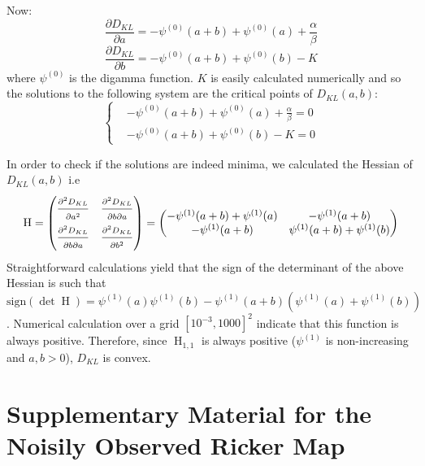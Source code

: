 \documentclass[12pt]{article}
\begin{document}
\begin{appendices}
	Now:
	\begin{equation}
	\frac{\partial D_{KL}}{\partial a} = -\psi^{(0)}(a+b) + \psi^{(0)}(a) + \frac{\alpha}{\beta}
	\end{equation}
	\begin{equation}
	\frac{\partial D_{KL}}{\partial b} = -\psi^{(0)}(a+b) + \psi^{(0)}(b) - K 
	\end{equation}
	where $\psi^{(0)}$ is the digamma function.
	$K$ is easily calculated numerically and so the solutions to the following system are the critical points of $D_{KL}(a,b)$:
	\[	\begin{cases}
	& -\psi^{(0)}(a+b) + \psi^{(0)}(a) + \frac{\alpha}{\beta} = 0 \\
	& -\psi^{(0)}(a+b) + \psi^{(0)}(b) - K  = 0
	\end{cases}\]
	
	In order to check if the solutions are indeed minima, we calculated the Hessian of $D_{KL}(a, b)$ i.e
	\begin{equation*}
	\text{H} = \begin{pmatrix}
	\frac{\strut \partial^2 D_{KL}}{\strut \partial a^2} & \frac{\strut \partial^2 D_{KL}}{\strut \partial b \partial a} \\
	\frac{\strut \partial^2 D_{KL}}{\strut \partial b \partial a} & \frac{\strut \partial^2 D_{KL}}{\strut \partial b^2} 
	\end{pmatrix} =
	\begin{pmatrix}
	-\psi^{(1)}(a+b) + \psi^{(1)}(a) & -\psi^{(1)}(a+b) \\
	-\psi^{(1)}(a+b) & \psi^{(1)}(a+b) + \psi^{(1)}(b)
	\end{pmatrix}
	\end{equation*}
	Straightforward calculations yield that the sign of the determinant of the above Hessian is such that $\text{sign}(\det{\operatorname{H}}) = \psi^{(1)}(a)\psi^{(1)}(b) - \psi^{(1)}(a+b)(\psi^{(1)}(a)+\psi^{(1)}(b))$.
	Numerical calculation over a grid $[10^{-3}, 1000]^2$ indicate that this function is always positive. Therefore, since $\operatorname{H}_{1,1}$ is always positive ($\psi^{(1)}$ is non-increasing and $a, b > 0$), $D_{KL}$ is convex.
	
	\section{Supplementary Material for the Noisily Observed Ricker Map}

\end{appendices}
\end{document}
